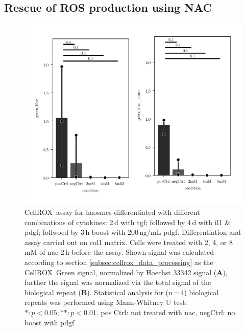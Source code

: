     \subsection{Rescue of ROS production using NAC}
        \begin{figure}[h!]
    \capstart
        \centering
    	\includegraphics{Abbildung/NAC_quench.pdf}

    	\begin{minipage}{\captionwidth}
    		\caption[NAC quench]{ \newline
            CellROX\texttrademark~assay for \acp{haosmc} differentiated with different combinations of cytokines: 2\,d with \ac{tgf}; followed by 4\,d with \ac{il1} \& \ac{pdgf}; follwoed by 3\,h boost with 200\,ng/mL \ac{pdgf}. Differentiation and assay carried out on \ac{col1} matrix. Cells were treated with 2, 4, or 8\,mM of \ac{nac} 2\,h before the assay.
            Shown signal was calculated according to section \ref{subsec:cellrox_data_processing} as the CellROX\texttrademark~Green signal, normalized by Hoechst 33342 signal (\textbf{A}), further the signal was normalized via the total signal of the biological repeat (\textbf{B}). Statistical analysis for (n\,=\,4) biological repeats was performed using Mann-Whitney U test: $*: p < 0.05; **: p < 0.01$.
            pos Ctrl: not treated with \ac{nac}, negCtrl: no boost with \ac{pdgf}}
    		\label{fig:NAC_quench}
    	\end{minipage}
    \end{figure}

